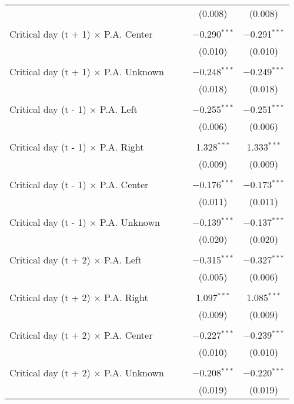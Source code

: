 \documentclass[
]{article}
\begin{document}
\begin{table}[!htbp]
{\begin{tabular}{@{\extracolsep{5pt}}lcccc}
  &  &  & (0.008) & (0.008) \\ 
  & & & & \\ 
 Critical day (t + 1) $\times$ P.A. Center &  &  & $-$0.290$^{***}$ & $-$0.291$^{***}$ \\ 
  &  &  & (0.010) & (0.010) \\ 
  & & & & \\ 
 Critical day (t + 1) $\times$ P.A. Unknown &  &  & $-$0.248$^{***}$ & $-$0.249$^{***}$ \\ 
  &  &  & (0.018) & (0.018) \\ 
  & & & & \\ 
 Critical day (t - 1) $\times$ P.A. Left &  &  & $-$0.255$^{***}$ & $-$0.251$^{***}$ \\ 
  &  &  & (0.006) & (0.006) \\ 
  & & & & \\ 
 Critical day (t - 1) $\times$ P.A. Right &  &  & 1.328$^{***}$ & 1.333$^{***}$ \\ 
  &  &  & (0.009) & (0.009) \\ 
  & & & & \\ 
 Critical day (t - 1) $\times$ P.A. Center &  &  & $-$0.176$^{***}$ & $-$0.173$^{***}$ \\ 
  &  &  & (0.011) & (0.011) \\ 
  & & & & \\ 
 Critical day (t - 1) $\times$ P.A. Unknown &  &  & $-$0.139$^{***}$ & $-$0.137$^{***}$ \\ 
  &  &  & (0.020) & (0.020) \\ 
  & & & & \\ 
 Critical day (t + 2) $\times$ P.A. Left &  &  & $-$0.315$^{***}$ & $-$0.327$^{***}$ \\ 
  &  &  & (0.005) & (0.006) \\ 
  & & & & \\ 
 Critical day (t + 2) $\times$ P.A. Right &  &  & 1.097$^{***}$ & 1.085$^{***}$ \\ 
  &  &  & (0.009) & (0.009) \\ 
  & & & & \\ 
 Critical day (t + 2) $\times$ P.A. Center &  &  & $-$0.227$^{***}$ & $-$0.239$^{***}$ \\ 
  &  &  & (0.010) & (0.010) \\ 
  & & & & \\ 
 Critical day (t + 2) $\times$ P.A. Unknown &  &  & $-$0.208$^{***}$ & $-$0.220$^{***}$ \\ 
  &  &  & (0.019) & (0.019) \\ 

\end{tabular}}
\end{table}
\end{document}
